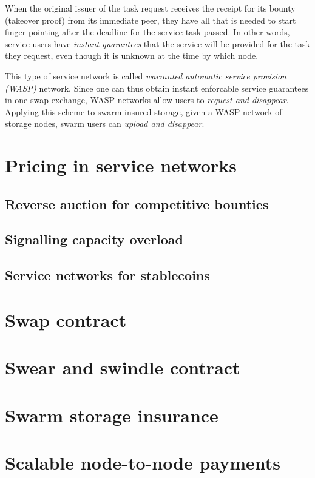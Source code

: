 \documentclass[a4paper,10pt]{article}
\newcommand\gloss[1]{\emph{\gls{#1}}}
\begin{document}
When the original issuer of the task request receives the receipt for its bounty (takeover proof) from its immediate peer,
they have all that is needed to start finger pointing after the deadline for the service task passed. In other words, service users have \emph{instant guarantees} that the service will be provided for the task they request, even though it is unknown at the time by which node.

This type of service network is called \gloss{warranted automatic service provision (WASP)} network.
Since one can thus obtain instant enforcable service guarantees 
in one swap exchange, WASP networks allow users to \gloss{request and disappear}. Applying this scheme to swarm insured storage, given a WASP network of storage nodes, swarm users can \emph{upload and disappear}.

\section{Pricing in service networks}

\subsection{Reverse auction for competitive bounties}

\subsection{Signalling capacity overload}
\subsection{Service networks for stablecoins}

\cite{btcmicro2014}
\cite{decker2015fast}
\cite{poon2015bitcoin}  %
\cite{prihodko2016flare} %
\cite{tremback2015universal}  %
\cite{bonneau2014mixcoin} %
\cite{ethersphere2016sw3}
\cite{ethersphere2016smash}
\cite{maymounkov2002kademlia}
\cite{heep2010r}
\cite{malavolta2017concurrency}
\cite{chiesa2017decentralized}
\cite{heilman2016tumblebit}
\cite{green2016bolt}
\cite{miller2017sprites}
\cite{mcdonald2017payment}
\cite{diferrante2017payment}


\appendix
\section{Swap contract}
\section{Swear and swindle contract}
\section{Swarm storage insurance}
\section{Scalable node-to-node payments}
\printglossary
\end{document}
